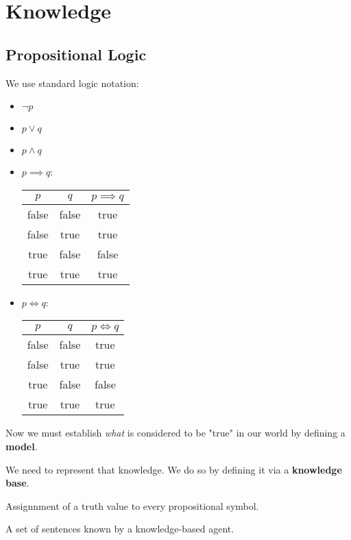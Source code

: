 \chapter{Knowledge}
\section{Propositional Logic}

We use standard logic notation:
\begin{itemize}
	\item \(\neg p\)
	\item \(p \lor q\) 
	\item \(p \land q\) 
	\item \(p \implies q\): \\
		\begin{tabular}[h]{|c|c|c|}
			\hline
			\(p\)  & \(q\)  & \(p \implies q\) \\
			\hline
			false & false & true \\
			false & true & true \\
			true & false & false \\
			true & true & true \\
			\hline
		\end{tabular}
	\item \(p \iff q\): \\
		\begin{tabular}[h]{|c|c|c|}
			\hline 
			\(p\)  & \(q\)  & \(p \iff q\) \\
			\hline
			false & false & true \\
			false & true & true \\
			true & false & false \\
			true & true & true \\
			\hline 
		\end{tabular}
\end{itemize}

Now we must establish \emph{what} is considered to be "true" in our world by defining a \textbf{model}.

We need to represent that knowledge. We do so by defining it via a \textbf{knowledge base}.

\begin{definition}[Model]
	Assignnment of a truth value to every propositional symbol.
\end{definition}
\begin{definition}
	A set of sentences known by a knowledge-based agent.
\end{definition}

